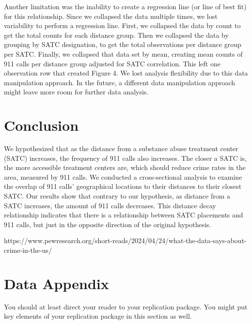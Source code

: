 \documentclass[12pt]{article}
\begin{document}
Another limitation was the inability to create a regression line (or line of best fit) for this relationship. Since we collapsed the data multiple times, we lost variability to perform a regression line. First, we collapsed the data by count to get the total counts for each distance group. Then we collapsed the data by grouping by SATC designation, to get the total observations per distance group per SATC. Finally, we collapsed that data set by mean, creating mean counts of 911 calls per distance group adjusted for SATC correlation. This left one observation row that created Figure 4. We lost analysis flexibility due to this data manipulation approach. In the future, a different data manipulation approach might leave more room for further data analysis. 

\section{Conclusion}
\label{sec:conclusion}

    We hypothesized that as the distance from a substance abuse treatment center (SATC) increases, the frequency of 911 calls also increases. The closer a SATC is, the more accessible treatment centers are, which should reduce crime rates in the area, measured by 911 calls. We conducted a cross-sectional analysis to examine the overlap of 911 calls' geographical locations to their distances to their closest SATC. Our results show that contrary to our hypothesis, as distance from a SATC increases, the amount of 911 calls decreases. This distance decay relationship indicates that there is a relationship between SATC placements and 911 calls, but just in the opposite direction of the original hypothesis. 
    
    


 

\newpage
\singlespacing
\setlength\bibsep{0pt}



https://www.pewresearch.org/short-reads/2024/04/24/what-the-data-says-about-crime-in-the-us/

\newpage
\section*{Data Appendix} \label{sec:appendixa}

You should at least direct your reader to your replication package. You might put key elements of your replication package in this section as well.
\end{document}
